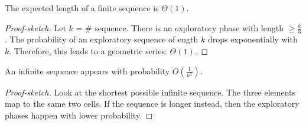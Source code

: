 \begin{mylemma}
The expected length of a finite sequence is $\Theta(1)$.
\end{mylemma}
\begin{proof}[Proof-sketch]
Let $k$ = \# sequence. There is an exploratory phase with length $\ge \frac{k}{3}$. The probability of an exploratory sequence of ength $k$ drops exponentially with $k$. Therefore, this leads to a geometric series: $\Theta(1)$. 
\end{proof}

\begin{mylemma}
An infinite sequence appears with probability $O(\frac{1}{n^2})$.
\end{mylemma}
\begin{proof}[Proof-sketch]
Look at the shortest possible infinite sequence. The three elements map to the same two cells. If the sequence is longer instead, then the exploratory phases happen with lower probability.
\end{proof}






